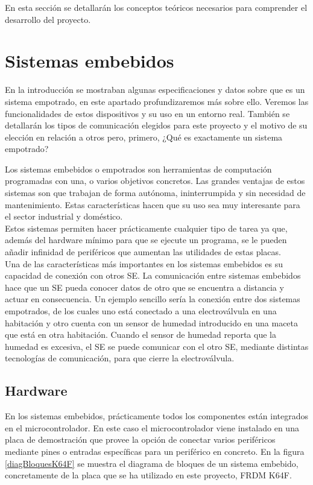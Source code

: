 
En esta sección se detallarán los conceptos teóricos necesarios para comprender el desarrollo del proyecto. 

\section{Sistemas embebidos}\label{sec:SE}

En la introducción se mostraban algunas especificaciones y datos sobre que es un sistema empotrado, en este apartado profundizaremos más sobre ello. Veremos las funcionalidades de estos dispositivos y su uso en un entorno real. También se detallarán los tipos de comunicación elegidos para este proyecto y el motivo de su elección en relación a otros pero, primero, ¿Qué es exactamente un sistema empotrado?

Los sistemas embebidos o empotrados son herramientas de computación programadas con una, o varios objetivos concretos. 
Las grandes ventajas de estos sistemas son que trabajan de forma autónoma, ininterrumpida y sin necesidad de mantenimiento. Estas características hacen que su uso sea muy interesante para el sector industrial y doméstico. \\
Estos sistemas permiten hacer prácticamente cualquier tipo de tarea ya que, además del hardware mínimo para que se ejecute un programa, se le pueden añadir infinidad de periféricos que aumentan las utilidades de estas placas. \\
Una de las características más importantes en los sistemas embebidos es su capacidad de conexión con otros SE. La comunicación entre sistemas embebidos  hace que un SE pueda conocer datos de otro que se encuentra a distancia y actuar en consecuencia. Un ejemplo sencillo sería la conexión entre dos sistemas empotrados, de los cuales uno está conectado a una electroválvula en una habitación y otro cuenta con un sensor de humedad introducido en una maceta que está en otra habitación. Cuando el sensor de humedad reporta que la humedad es excesiva, el SE se puede comunicar con el otro SE, mediante distintas tecnologías de comunicación, para que cierre la electroválvula.
 
\subsection{Hardware}\label{sec:Hardware}

En los sistemas embebidos, prácticamente todos los componentes están integrados en el microcontrolador. En este caso el microcontrolador viene instalado en una placa de demostración que provee la opción de conectar varios periféricos mediante pines o entradas específicas para un periférico en concreto. En la figura \ref{diagBloquesK64F} se muestra el diagrama de bloques de un sistema embebido, concretamente de la placa que se ha utilizado en este proyecto, FRDM K64F.

